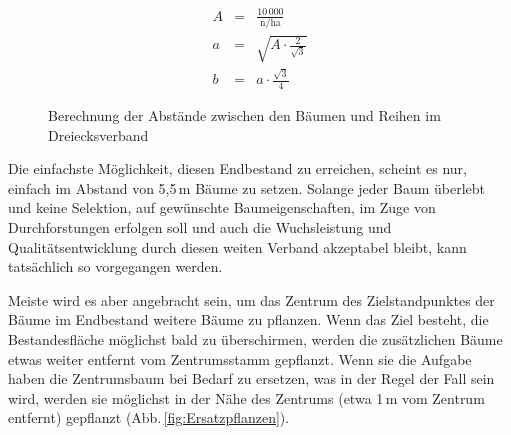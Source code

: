 \documentclass[twocolumn]{scrartcl}
\begin{document}
\begin{figure}[htbp]
  \centering
\begin{minipage}{.35\columnwidth}
\end{minipage}%
\begin{minipage}{.63\columnwidth}%
  \begin{eqnarray*}%
    A & = & \frac{10\,000}{\text{n/ha}}\\
    a & = & \sqrt{A \cdot \frac{2}{\sqrt{3}}}\\
    b & = & a \cdot \frac{\sqrt{3}}{4}
  \end{eqnarray*}%
\end{minipage}
\caption{Berechnung der Abstände zwischen den Bäumen und Reihen im Dreiecksverband}
\label{fig:dreiecksverbandEqu}
\end{figure}

Die einfachste Möglichkeit, diesen Endbestand zu erreichen, scheint es nur,
einfach im Abstand von 5,5\,m Bäume zu setzen. Solange jeder Baum überlebt und
keine Selektion, auf gewünschte Baumeigenschaften, im Zuge von Durchforstungen
erfolgen soll und auch die Wuchsleistung und Qualitätsentwicklung durch diesen
weiten Verband akzeptabel bleibt, kann tatsächlich so vorgegangen werden.

Meiste wird es aber angebracht sein, um das Zentrum des Zielstandpunktes der
Bäume im Endbestand weitere Bäume zu pflanzen. Wenn das Ziel besteht, die
Bestandesfläche möglichst bald zu überschirmen, werden die zusätzlichen Bäume
etwas weiter entfernt vom Zentrumsstamm gepflanzt. Wenn sie die Aufgabe haben
die Zentrumsbaum bei Bedarf zu ersetzen, was in der Regel der Fall sein wird,
werden sie möglichst in der Nähe des Zentrums (etwa 1\,m vom Zentrum entfernt)
gepflanzt (Abb.\,\ref{fig:Ersatzpflanzen}).
\end{document}
